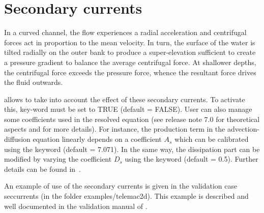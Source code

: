 \chapter{Secondary currents}
\label{ch:sec:curr}
In a curved channel, the flow experiences a radial acceleration and centrifugal
forces act in proportion to the mean velocity.
In turn, the surface of the water is tilted radially on the outer bank
to produce a super-elevation sufficient to create a pressure gradient 
to balance the average centrifugal force.
At shallower depths, the centrifugal force exceeds the pressure force,
whence the resultant force drives the fluid outwards.

 allows to take into account the effect of these secondary currents.
To activate this, key-word  must be set to TRUE
(default = FALSE).
User can also manage some coefficients used in the resolved equation
(see release note 7.0 for theoretical aspects and for more details).
For instance, the production term in the advection-diffusion equation linearly
depends on a coefficient $A_s$ which can be calibrated using the keyword
 (default = 7.071).
In the same way, the dissipation part can be modified by varying
the coefficient $D_{s}$ using the keyword
 (default = 0.5).
Further details can be found in~\cite{wang2014secondary}.

An example of use of the secondary currents is given in the validation case
seccurrents (in the folder examples/telemac2d). 
This example is described and well documented in the validation manual of
.
